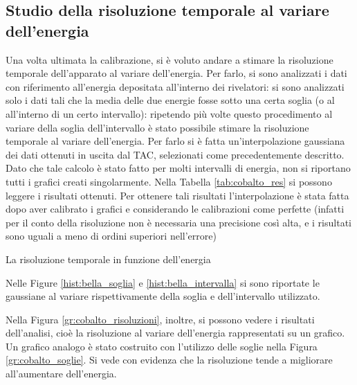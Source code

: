 \subsection{Studio della risoluzione temporale al variare dell'energia}

Una volta ultimata la calibrazione, si è voluto andare a stimare la risoluzione temporale dell'apparato al variare dell'energia.
Per farlo, si sono analizzati i dati con riferimento all'energia depositata all'interno dei rivelatori: si sono analizzati solo i dati tali
che la media delle due energie
fosse sotto una certa soglia (o al all'interno di un certo intervallo): ripetendo più
volte questo procedimento al variare della soglia dell'intervallo è stato possibile stimare la risoluzione temporale al variare dell'energia. Per farlo si è fatta un'interpolazione gaussiana dei dati ottenuti in uscita dal TAC, selezionati come precedentemente descritto.
Dato che tale calcolo è stato fatto per molti intervalli di energia, non si riportano tutti i grafici creati singolarmente.
Nella Tabella \ref{tab:cobalto_res} si possono leggere i risultati ottenuti. Per ottenere tali risultati l'interpolazione è stata fatta dopo aver calibrato i grafici e
considerando le calibrazioni come perfette (infatti per il conto della risoluzione non è necessaria una precisione così alta, e i risultati sono uguali a meno di ordini
superiori nell'errore)\\

%
\begin{table}
	\centering
	
	\caption{La risoluzione temporale in funzione dell'energia}
	\label{tab:cobalto_res}
\end{table}
%
Nelle Figure \ref{hist:bella_soglia} e \ref{hist:bella_intervalla} si sono riportate le gaussiane al variare rispettivamente della soglia e dell'intervallo utilizzato.


Nella Figura \ref{gr:cobalto_risoluzioni}, inoltre, si possono vedere i risultati dell'analisi, cioè la risoluzione al variare dell'energia rappresentati su un grafico.
Un grafico analogo è stato costruito con l'utilizzo delle soglie nella Figura \ref{gr:cobalto_soglie}. Si
vede con evidenza che la risoluzione tende a migliorare all'aumentare dell'energia.
\\
\\


